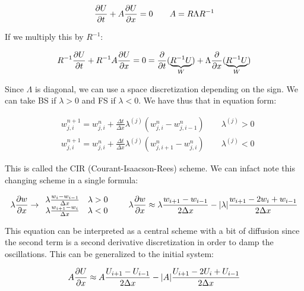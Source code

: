 \begin{equation}
\frac{\partial U}{\partial t}+ A\frac{\partial U}{\partial x} = 0 \qquad A = R\Lambda R^{-1}
\end{equation}

If we multiply this by $R^{-1}$: 

\begin{equation}
R^{-1}\frac{\partial U}{\partial t}+ R^{-1}A\frac{\partial U}{\partial x} = 0 = \frac{\partial}{\partial t} (\underbrace{R^{-1}U}_{W}) + \Lambda \frac{\partial}{\partial x} (\underbrace{R^{-1}U}_{W})
\end{equation}

Since $\Lambda$ is diagonal, we can use a space discretization depending on the sign. We can take BS if $\lambda > 0$ and FS if $\lambda < 0$. We have thus that in equation form: 

\begin{equation}
\begin{aligned}
&w_{j,i}^{n+1}= w_{j,i}^{n} + \frac{\Delta t}{\Delta x} \lambda ^{(j)}(w_{j,i}^{n} - w_{j,i-1}^{n}) \qquad \lambda ^{(j)}>0\\
&w_{j,i}^{n+1}= w_{j,i}^{n} + \frac{\Delta t}{\Delta x} \lambda ^{(j)}(w_{j,i+1}^{n} - w_{j,i}^{n}) \qquad \lambda ^{(j)}<0
\end{aligned}
\end{equation}

This is called the CIR (Courant-Isaacson-Rees) scheme. We can infact note this changing scheme in a single formula: 

\begin{equation}
\lambda \frac{\partial w}{\partial x} \rightarrow \begin{array}{c}
\lambda \frac{w_i - w_{i-1}}{\Delta x} \quad \lambda > 0\\
\lambda \frac{w_{i+1} - w_{i}}{\Delta x} \quad \lambda < 0
\end{array}
\qquad \lambda \frac{\partial w}{\partial x} \approx \lambda \frac{w_{i+1}-w_{i-1}}{2\Delta x} - |\lambda|\frac{w_{i+1}-2w_i + w_{i-1}}{2\Delta x} 
\end{equation}

This equation can be interpreted as a central scheme with a bit of diffusion since the second term is a second derivative discretization in order to damp the oscillations. This can be generalized to the initial system: 

\begin{equation}
A \frac{\partial U}{\partial x} \approx A\frac{U_{i+1}-U_{i-1}}{2\Delta x} - |A|\frac{U_{i+1}-2U_i + U_{i-1}}{2\Delta x} 
\end{equation}

